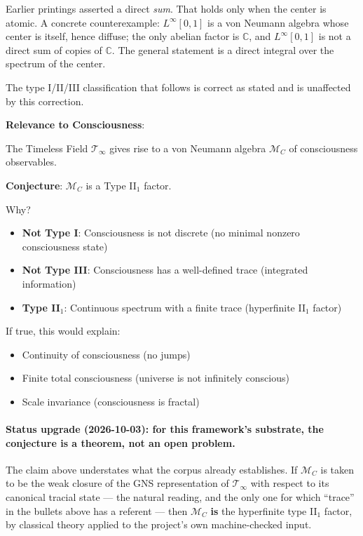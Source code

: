 \begin{remark}
\label{rem:vn-direct-integral-2026-10-03}
Earlier printings asserted a direct \emph{sum}. That holds only when the center
is atomic. A concrete counterexample: $L^\infty[0,1]$ is a von Neumann algebra
whose center is itself, hence diffuse; the only abelian factor is $\mathbb{C}$,
and $L^\infty[0,1]$ is not a direct sum of copies of $\mathbb{C}$. The general
statement is a direct integral over the spectrum of the center.

The type I/II/III classification that follows is correct as stated and is
unaffected by this correction.
\end{remark}

\begin{level3}
\textbf{Relevance to Consciousness}:

The Timeless Field $\mathcal{T}_\infty$ gives rise to a von Neumann algebra $\mathcal{M}_C$ of consciousness observables.

\textbf{Conjecture}: $\mathcal{M}_C$ is a Type II$_1$ factor.

Why?
\begin{itemize}
\item \textbf{Not Type I}: Consciousness is not discrete (no minimal nonzero consciousness state)
\item \textbf{Not Type III}: Consciousness has a well-defined trace (integrated information)
\item \textbf{Type II$_1$}: Continuous spectrum with a finite trace (hyperfinite II$_1$ factor)
\end{itemize}

If true, this would explain:
\begin{itemize}
\item Continuity of consciousness (no jumps)
\item Finite total consciousness (universe is not infinitely conscious)
\item Scale invariance (consciousness is fractal)
\end{itemize}

\paragraph{Status upgrade (2026-10-03): for this framework's substrate, the
conjecture is a theorem, not an open problem.}
The claim above understates what the corpus already establishes. If
$\mathcal{M}_C$ is taken to be the weak closure of the GNS representation of
$\mathcal{T}_\infty$ with respect to its canonical tracial state --- the natural
reading, and the only one for which ``trace'' in the bullets above has a referent
--- then $\mathcal{M}_C$ \textbf{is} the hyperfinite type II$_1$ factor, by
classical theory applied to the project's own machine-checked input.


\end{level3}
